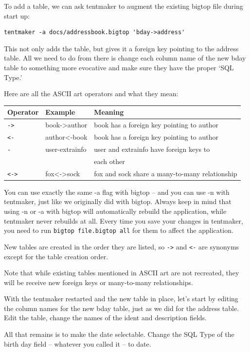 To add a table, we can ask tentmaker to augment the existing bigtop file
during start up:

\begin{verbatim}
tentmaker -a docs/addressbook.bigtop 'bday->address'
\end{verbatim}

This not only adds the table, but gives it a foreign key pointing to the
address table.  All we need to do from there is change each column name
of the new bday table to something more evocative and make sure they have
the proper `SQL Type.'

Here are all the ASCII art operators and what they mean:

\begin{tabular}{l|l|l}
Operator   & Example & Meaning \\
\hline
\verb+->+  & book->author   & book has a foreign key pointing to author \\
\verb+<-+  & author<-book   & book has a foreign key pointing to author \\
\verb+-+   & user-extrainfo & user and extrainfo have foreign keys to   \\
           &                & each other                                \\
\verb+<->+ & fox<->sock     & fox and sock share a many-to-many relationship\\
\end{tabular}

You can use exactly the same -a flag with bigtop -- and you can use -n
with tentmaker, just like we originally did with bigtop.  Always keep in
mind that using -n or -a with bigtop will automatically rebuild the
application, while tentmaker never rebuilds at all.  Every time you
save your changes in tentmaker, you need to run \verb+bigtop file.bigtop all+
for them to affect the application.

New tables are created in the order they are listed, so \verb+->+ and
\verb+<-+ are synonyms except for the table creation order.

Note that while existing tables mentioned in ASCII art are not recreated,
they will be receive new foreign keys or many-to-many relationships.

With the tentmaker restarted and the new table in place, let's start
by editing the column names for the new bday table, just as we did for
the address table.  Edit the table, change the names of the ident and
description fields.

All that remains is to make the date selectable.  Change the SQL Type of
the birth day field -- whatever you called it -- to date.

